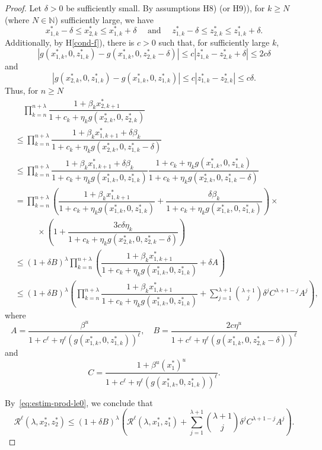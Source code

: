 \documentclass[reqno]{amsart}
\renewcommand{\le}{\leqslant}
\renewcommand{\ge}{\geqslant}
\newcommand{\lbd}{\lambda}
\newcommand{\cR}{\mathcal R}
\newcommand{\N}{\ensuremath{\mathds N}}
\begin{document}
{{\begin{proof}
Let $\delta>0$ be sufficiently small. By assumptions {H8)} (or {H9)}), for $k \ge N$ (where $N \in \N$) sufficiently large, we have
$$x^*_{1,k} -\delta \le x_{2,k}^* \le x_{1,k}^*+ \delta \quad \text{ and } \quad z^*_{1,k} -\delta \le z_{2,k}^* \le z_{1,k}^*+ \delta.$$
Additionally, by H\ref{cond-f}), there is $c>0$ such that, for sufficiently large $k$,
$$|g(x^*_{1,k},0,z^*_{1,k})-g(x^*_{1,k},0,z^*_{2,k}-\delta)|\le c |z^*_{1,k}-z^*_{2,k}+\delta| \le 2c\delta $$
and
$$|g(x^*_{2,k},0,z^*_{1,k})-g(x^*_{1,k},0,z^*_{1,k})|\le c |z^*_{1,k}-z^*_{2,k}| \le c\delta.$$
Thus, for $n \ge N$
\begin{equation}\label{eq:estim-prod-le0}
\begin{split}
& \quad \prod_{k=n}^{n+\lambda} \dfrac{1+\beta_kx^*_{2,k+1}}{1+c_k+\eta_kg(x^*_{2,k},0,z^*_{2,k})}\\
& \le \prod_{k=n}^{n+\lambda} \dfrac{1+\beta_kx^*_{1,k+1}+\delta\beta_k}{1+c_k+\eta_kg(x^*_{2,k},0,z^*_{1,k}-\delta)}\\
& \le \prod_{k=n}^{n+\lambda} \dfrac{1+\beta_kx^*_{1,k+1}+\delta\beta_k}{1+c_k+\eta_kg(x^*_{1,k},0,z^*_{1,k})}\dfrac{1+c_k+\eta_kg(x^*_{1,k},0,z^*_{1,k})}{1+c_k+\eta_kg(x^*_{2,k},0,z^*_{1,k}-\delta)}\\
& = \prod_{k=n}^{n+\lambda} \left(\dfrac{1+\beta_kx^*_{1,k+1}}{1+c_k+\eta_kg(x^*_{1,k},0,z^*_{1,k})}+\dfrac{\delta\beta_k}{1+c_k+\eta_kg(x^*_{1,k},0,z^*_{1,k})}\right)\times\\
& \phantom{==} \times
\left(1+\dfrac{3c\delta\eta_k}{1+c_k+\eta_kg(x^*_{2,k},0,z^*_{2,k}-\delta)}\right)\\
& \le (1+\delta B)^\lbd \prod_{k=n}^{n+\lambda} \left(\dfrac{1+\beta_kx^*_{1,k+1}}{1+c_k+\eta_kg(x^*_{1,k},0,z^*_{1,k})}+\delta A\right)
\\
& \le (1+\delta B)^\lbd \left(\prod_{k=n}^{n+\lambda} \dfrac{1+\beta_kx^*_{1,k+1}}{1+c_k+\eta_kg(x^*_{1,k},0,z^*_{1,k})}
+  \sum_{j=1}^{\lambda+1} \binom{\lambda+1}{j}\delta^j  C^{\lambda+1-j} A^j\right),
\end{split}
\end{equation}
where
$$A=\dfrac{\beta^u}{1+c^\ell+\eta^\ell (g(x^*_{1,k},0,z^*_{1,k}))^\ell}, \quad B=\dfrac{2c\eta^u}{1+c^\ell+\eta^\ell (g(x^*_{1,k},0,z^*_{2,k}-\delta))^\ell}$$
and
$$C=\dfrac{1+\beta^u (x^*_1)^u}{1+c^\ell+\eta^\ell (g(x^*_{1,k},0,z^*_{1,k}))^\ell}.$$

By~\eqref{eq:estim-prod-le0}, we conclude that
$$\cR^\ell(\lambda,x^*_2,z^*_2) \le (1+\delta B)^\lbd \left(\cR^\ell(\lambda,x^*_1,z^*_1)
+  \sum_{j=1}^{\lambda+1} \binom{\lambda+1}{j}\delta^j  C^{\lambda+1-j} A^j\right).$$


\end{proof}}}
\end{document}
